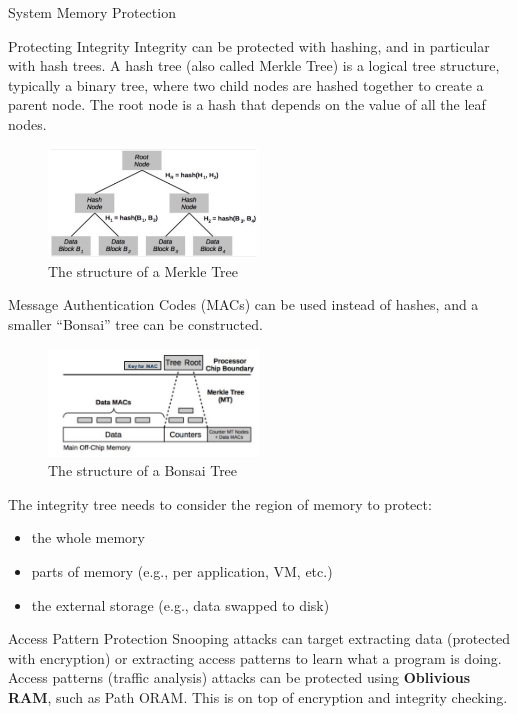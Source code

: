 \begin{section}{System Memory Protection}
  \begin{subsection}{Protecting Integrity}
    Integrity can be protected with hashing, and in particular with hash trees. A hash tree (also
    called Merkle Tree) is a logical tree structure, typically a binary tree, where two child nodes
    are hashed together to create a parent node. The root node is a hash that depends on the value
    of all the leaf nodes.

    \begin{figure}[H]
      \centering
      \includegraphics[width=0.5\textwidth]{img/hardware/merkle tree.png}
      \caption{The structure of a Merkle Tree}
    \end{figure}
    Message Authentication Codes (MACs) can be used instead of hashes, and a smaller “Bonsai” tree
    can be constructed.
    \begin{figure}[H]
      \centering
      \includegraphics[width=0.5\textwidth]{img/hardware/bonsai hash tree.png}
      \caption{The structure of a Bonsai Tree}
    \end{figure}

    The integrity tree needs to consider the region of memory to protect:
    \begin{itemize}
      \item the whole memory
      \item parts of memory (e.g., per application, VM, etc.)
      \item the external storage (e.g., data swapped to disk)
    \end{itemize}
  \end{subsection}

  \begin{subsection}{Access Pattern Protection}
    Snooping attacks can target extracting data (protected with encryption) or extracting access
    patterns to learn what a program is doing.\\
    Access patterns (traffic analysis) attacks can be protected using \textbf{Oblivious RAM}, such
    as Path ORAM. This is on top of encryption and integrity checking.


\end{subsection}
\end{section}
